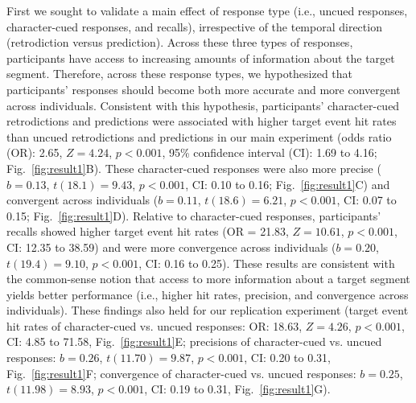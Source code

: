 \documentclass[10pt]{article}
\begin{document}
First we sought to validate a main effect of response type (i.e., uncued responses, character-cued responses, and recalls), irrespective of the temporal direction (retrodiction versus prediction). Across these three types of responses, participants have access to increasing amounts of information about the target segment. Therefore, across these response types, we hypothesized that participants' responses should become both more accurate and more convergent across individuals. Consistent with this hypothesis, participants' character-cued retrodictions and predictions were associated with higher target event hit rates than uncued retrodictions and predictions in our main experiment (odds ratio (OR): 2.65, $Z = 4.24$, $p < 0.001$, 95\% confidence interval (CI): 1.69 to 4.16; Fig.~\ref{fig:result1}B). These character-cued responses were also more precise ($b = 0.13$, $t(18.1) = 9.43$, $p < 0.001$, CI: 0.10 to 0.16; Fig.~\ref{fig:result1}C) and convergent across individuals ($b = 0.11$, $t(18.6) = 6.21$, $p < 0.001$, CI: 0.07 to 0.15; Fig.~\ref{fig:result1}D). Relative to character-cued responses, participants' recalls showed higher target event hit rates (OR = 21.83, $Z = 10.61$, $p < 0.001$, CI: 12.35 to 38.59) and were more convergence across individuals ($b = 0.20$, $t(19.4) = 9.10$, $p < 0.001$, CI: 0.16 to 0.25). These results are consistent with the common-sense notion that access to more information about a target segment yields better performance (i.e., higher hit rates, precision, and convergence across individuals).  These findings also held for our replication experiment (target event hit rates of character-cued vs. uncued responses: OR: 18.63, $Z = 4.26$, $p < 0.001$, CI: 4.85 to 71.58, Fig.~\ref{fig:result1}E; precisions of character-cued vs. uncued responses: $b = 0.26$, $t(11.70) = 9.87$, $p < 0.001$, CI: 0.20 to 0.31, Fig.~\ref{fig:result1}F; convergence of character-cued vs. uncued responses: $b = 0.25$, $t(11.98) = 8.93$, $p < 0.001$, CI: 0.19 to 0.31, Fig.~\ref{fig:result1}G).
\end{document}
